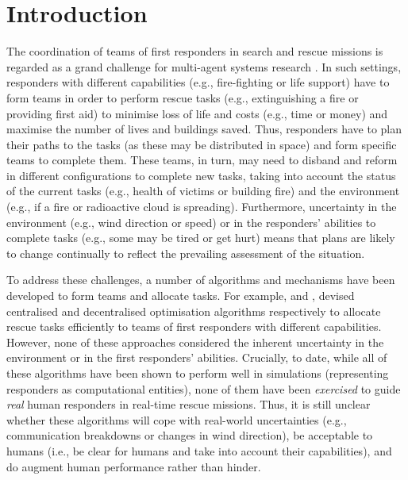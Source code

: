 \section{Introduction}
\noindent The coordination of teams of first responders in search and rescue missions is regarded as  a grand challenge for multi-agent systems research \cite{kitano:2001}. In such settings, responders with different capabilities (e.g., fire-fighting or life support) have to form teams in order to perform rescue tasks (e.g., extinguishing a fire or providing first aid) to minimise  loss of life and costs (e.g., time or money) and maximise the number of lives and buildings saved. Thus, responders have to plan their paths to the tasks (as these may be distributed in space) and form specific teams  to complete them. These teams, in turn, may  need to disband and reform in different configurations to complete new tasks, taking into account the status  of the current tasks  (e.g., health of victims or building fire) and the environment (e.g., if a fire or radioactive cloud is spreading). Furthermore, uncertainty in the environment (e.g., wind direction or speed) or in the responders' abilities to complete tasks (e.g., some may be tired or get hurt) means that plans are likely to change continually to reflect the prevailing assessment of the situation. 

To address these challenges, a number of algorithms and mechanisms have been developed to form teams and allocate tasks. For example, \cite{ramchurn:etal:2010,Scerri2005} and \cite{Chapman2009}, devised centralised and decentralised optimisation algorithms respectively to allocate rescue tasks efficiently to teams of first responders with different capabilities. However, none of these approaches considered the inherent uncertainty in the environment or in the first responders' abilities. Crucially, to date, while all of these algorithms have been shown to perform well in simulations (representing responders as computational entities), none of them have been \emph{exercised} to guide \emph{real} human responders in real-time rescue missions. Thus, it is still unclear whether these algorithms will cope with real-world uncertainties (e.g., communication breakdowns or changes in wind direction), be acceptable to humans (i.e., be clear for humans and take into account their capabilities), and do augment  human performance rather than hinder.

